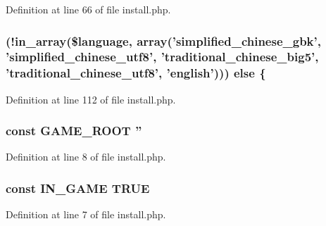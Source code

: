 Definition at line 66 of file install.\+php.

\hypertarget{templates_2install_8php_afadbcec73e75eda2ede71036df8ae97c}{
\subsubsection[{else}]{ (!in\+\_\+array(\${\bf language}, array('simplified\+\_\+chinese\+\_\+gbk', 'simplified\+\_\+chinese\+\_\+utf8', 'traditional\+\_\+chinese\+\_\+big5', 'traditional\+\_\+chinese\+\_\+utf8', 'english'))) else \{}}\label{templates_2install_8php_afadbcec73e75eda2ede71036df8ae97c}


Definition at line 112 of file install.\+php.

\hypertarget{templates_2install_8php_a8e43cd27c8e744fff590983bc396aba3}{
\subsubsection[{G\+A\+M\+E\+\_\+\+R\+O\+O\+T}]{\setlength{\rightskip}{0pt plus 5cm}const G\+A\+M\+E\+\_\+\+R\+O\+O\+T ''}}\label{templates_2install_8php_a8e43cd27c8e744fff590983bc396aba3}


Definition at line 8 of file install.\+php.

\hypertarget{templates_2install_8php_a12c82f3d28569a3f80804f1e72cef14c}{
\subsubsection[{I\+N\+\_\+\+G\+A\+M\+E}]{\setlength{\rightskip}{0pt plus 5cm}const I\+N\+\_\+\+G\+A\+M\+E T\+R\+U\+E}}\label{templates_2install_8php_a12c82f3d28569a3f80804f1e72cef14c}


Definition at line 7 of file install.\+php.

